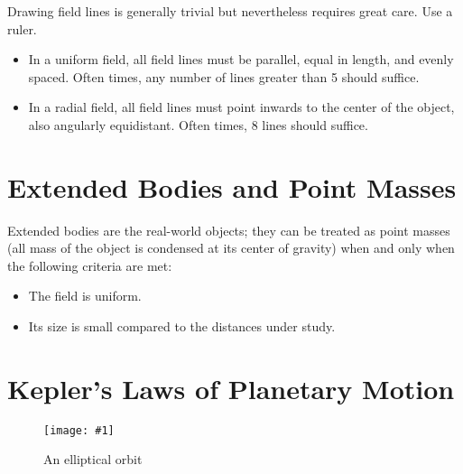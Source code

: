 \documentclass[a4paper,12pt]{article}
\let\oldsection\section
\renewcommand\section{\clearpage\oldsection}
\newcommand{\img}[4]{\begin{center}
  \begin{figure}[H]
    \centering
    \texttt{[image: \#1]}
    \caption{#3}
    \label{fig:#4}
  \end{figure}
\end{center}}
\begin{document}
Drawing field lines is generally trivial but nevertheless requires great care. Use a ruler.
\begin{itemize}
  \item In a uniform field, all field lines must be parallel, equal in length, and evenly spaced. Often times, any number of lines greater than 5 should suffice.
  \item In a radial field, all field lines must point inwards to the center of the object, also angularly equidistant. Often times, 8 lines should suffice.
\end{itemize}

\section{Extended Bodies and Point Masses}

Extended bodies are the real-world objects; they can be treated as point masses (all mass of the object is condensed at its center of gravity) when and only when the following criteria are met:
\begin{itemize}
  \item The field is uniform.
  \item Its size is small compared to the distances under study.
\end{itemize}

\section{Kepler's Laws of Planetary Motion}

\img{orbit.png}{0.9}{An elliptical orbit}{orbit}
\end{document}
